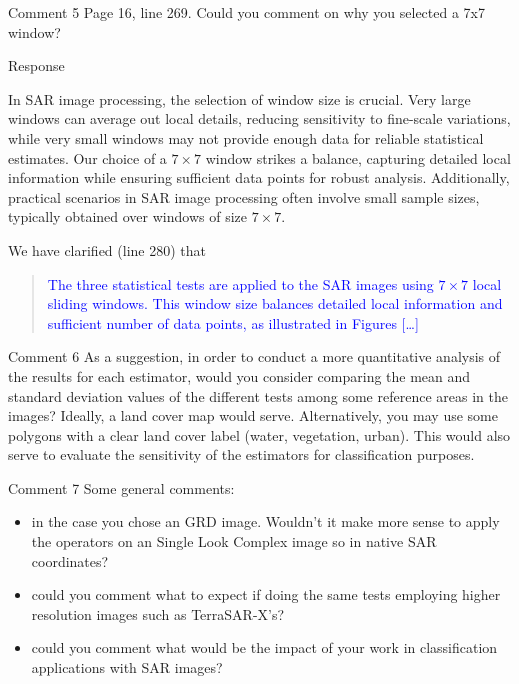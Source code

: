 \documentclass[11pt]{report}
\begin{document}
\begin{reviewbox}{Comment 5}
Page 16, line 269. Could you comment on why you selected a 7x7 window?
\end{reviewbox}
\begin{responsebox}{Response}

In SAR image processing, the selection of window size is crucial. Very large windows can average out local details, reducing sensitivity to fine-scale variations, while very small windows may not provide enough data for reliable statistical estimates. Our choice of a $7\times 7$ window strikes a balance, capturing detailed local information while ensuring sufficient data points for robust analysis. Additionally, practical scenarios in SAR image processing often involve small sample sizes, typically obtained over windows of size $7\times 7$. 

We have clarified (line 280) that
\begin{quote}
	\textcolor{blue}{The three statistical tests are applied to the SAR images using $7\times 7$ local sliding windows.
		This window size balances detailed local information and sufficient number of data points, as illustrated in Figures [\dots]}
\end{quote}



\end{responsebox}


\begin{reviewbox}{Comment 6}
As a suggestion, in order to conduct a more quantitative analysis of the results for each estimator, would you consider comparing the mean and standard deviation values of the different tests among some reference areas in the images? Ideally, a land cover map would serve. Alternatively, you may use some polygons with a clear land cover label (water, vegetation, urban). This would also serve to evaluate the sensitivity of the estimators for classification purposes.
\end{reviewbox}

\begin{reviewbox}{Comment 7}
Some general comments:
\begin{itemize}
	\item in the case you chose an GRD image. Wouldn't it make more sense to apply the operators on an Single Look Complex image so in native SAR coordinates?
	\item could you comment what to expect if doing the same tests employing higher resolution images such as TerraSAR-X's?
	\item could you comment what would be the impact of your work in classification applications with SAR images?
\end{itemize}
\end{reviewbox}
\end{document}
